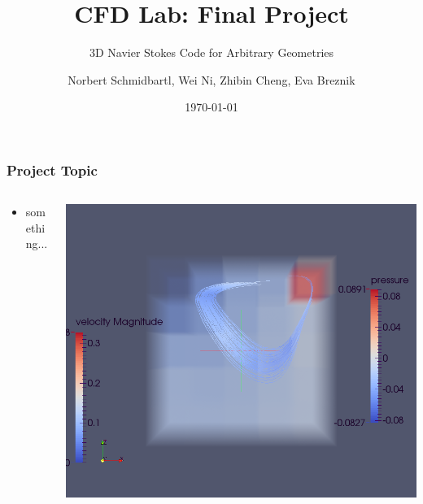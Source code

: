 \documentclass{beamer}
\title{CFD Lab: Final Project}
\subtitle{3D Navier Stokes Code for Arbitrary Geometries}    %
\author{Norbert Schmidbartl, Wei Ni, Zhibin Cheng, Eva Breznik}
\institute[TUM]{Technische Universit\"{a}t M\"{u}nchen \\ Fakult\"{a}t f\"{u}r Informatik}
\date{\today}
\begin{document}
\begin{frame}
\maketitle %
\end{frame}





\begin{frame}
\frametitle{Project Topic}

\begin{columns}
\begin{column}{0.48\textwidth}
\begin{itemize}
\item something...
\end{itemize} \end{column}
\begin{column}{0.48\textwidth}
\includegraphics[height = 0.45\textheight]{simpleCavity.png}
\end{column}
\end{columns}
\end{frame}
\end{document}
